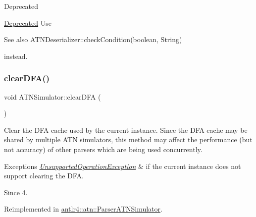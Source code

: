 \begin{DoxyRefDesc}{Deprecated}
\item[\hyperlink{deprecated__deprecated000003}{Deprecated}]Use \begin{DoxySeeAlso}{See also}
A\+T\+N\+Deserializer\+::check\+Condition(boolean, String)


\end{DoxySeeAlso}
instead. \end{DoxyRefDesc}
\mbox{\label{classantlr4_1_1atn_1_1ATNSimulator_a3358fa3e8ebcb4abeeceb914b0b07f10}} 
\subsubsection{\texorpdfstring{clear\+D\+F\+A()}{clearDFA()}}
{\footnotesize\ttfamily void A\+T\+N\+Simulator\+::clear\+D\+FA (\begin{DoxyParamCaption}{ }\end{DoxyParamCaption})\hspace{0.3cm}{\ttfamily [virtual]}}

Clear the D\+FA cache used by the current instance. Since the D\+FA cache may be shared by multiple A\+TN simulators, this method may affect the performance (but not accuracy) of other parsers which are being used concurrently.


\begin{DoxyExceptions}{Exceptions}
{\em \hyperlink{classantlr4_1_1UnsupportedOperationException}{Unsupported\+Operation\+Exception}} & if the current instance does not support clearing the D\+FA.\\
\hline
\end{DoxyExceptions}
\begin{DoxySince}{Since}
4. 
\end{DoxySince}


Reimplemented in \hyperlink{classantlr4_1_1atn_1_1ParserATNSimulator_a846da7dc607b212d443cb401f5830bae}{antlr4\+::atn\+::\+Parser\+A\+T\+N\+Simulator}.

\mbox{\label{classantlr4_1_1atn_1_1ATNSimulator_ae516df637ee1f4be4787d533ed88b3b9}} 
